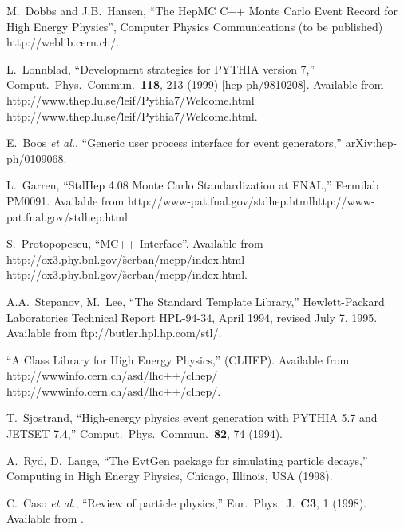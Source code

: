 \documentclass[11pt,letterpaper]{article}
\begin{document}
\begin{thebibliography}{99}

  M.~Dobbs and J.B.~Hansen, ``The HepMC C++ Monte Carlo Event Record for
  High Energy Physics'', Computer Physics Communications (to be
  published) 
  {http://weblib.cern.ch/}.  

  L.~Lonnblad, ``Development strategies for PYTHIA version 7,''
  Comput.\ Phys.\ Commun.\  {\bf 118}, 213 (1999)
  [hep-ph/9810208].
  Available from \htmladdnormallink
  {http://www.thep.lu.se/\~leif/Pythia7/Welcome.html}
  {http://www.thep.lu.se/\~leif/Pythia7/Welcome.html}.

E.~Boos {\it et al.},
``Generic user process interface for event generators,''
arXiv:hep-ph/0109068.

  L.~Garren, ``StdHep 4.08 Monte Carlo Standardization at FNAL,''
  Fermilab PM0091. Available from \htmladdnormallink
  {http://www-pat.fnal.gov/stdhep.html}{http://www-pat.fnal.gov/stdhep.html}.

  S.~Protopopescu, ``MC++ Interface''.
  Available from \htmladdnormallink
  {http://ox3.phy.bnl.gov/\~serban/mcpp/index.html}
  {http://ox3.phy.bnl.gov/\~serban/mcpp/index.html}.

  A.A.~Stepanov, M.~Lee, ``The Standard Template Library,''
  Hewlett-Packard Laboratories Technical Report HPL-94-34, April 1994,
  revised July 7, 1995.
  Available from 
  {ftp://butler.hpl.hp.com/stl/}.

  ``A Class Library for High Energy Physics,'' (CLHEP).
  Available from \htmladdnormallink
  {http://wwwinfo.cern.ch/asd/lhc++/clhep/}
  {http://wwwinfo.cern.ch/asd/lhc++/clhep/}.

  T.~Sjostrand,
  ``High-energy physics event generation with PYTHIA 5.7 and JETSET 7.4,''
  Comput.\ Phys.\ Commun.\  {\bf 82}, 74 (1994).

  A.~Ryd, D.~Lange,
  ``The EvtGen package for simulating particle decays,''
  Computing in High Energy Physics, Chicago, Illinois, USA (1998).

  C.~Caso {\it et al.}, ``Review of particle physics,''
  Eur.\ Phys.\ J.\  {\bf C3}, 1 (1998).
  Available from .


\end{thebibliography}

%
%
\end{document}
